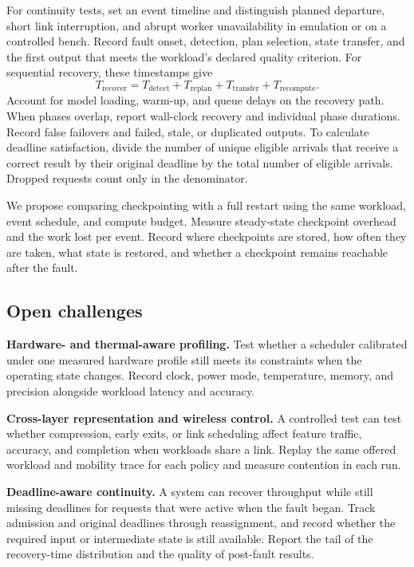 \documentclass[journal]{IEEEtran}
\begin{document}
For continuity tests, set an event timeline and distinguish planned departure, short link interruption, and abrupt worker unavailability in emulation or on a controlled bench. Record fault onset, detection, plan selection, state transfer, and the first output that meets the workload's declared quality criterion. For sequential recovery, these timestamps give
\begin{equation}\label{eq:recovery}
T_{\mathrm{recover}}=T_{\mathrm{detect}}+T_{\mathrm{replan}}
 +T_{\mathrm{transfer}}+T_{\mathrm{recompute}}.
\end{equation}
Account for model loading, warm-up, and queue delays on the recovery path. When phases overlap, report wall-clock recovery and individual phase durations. Record false failovers and failed, stale, or duplicated outputs. To calculate deadline satisfaction, divide the number of unique eligible arrivals that receive a correct result by their original deadline by the total number of eligible arrivals. Dropped requests count only in the denominator.

We propose comparing checkpointing with a full restart using the same workload, event schedule, and compute budget. Measure steady-state checkpoint overhead and the work lost per event. Record where checkpoints are stored, how often they are taken, what state is restored, and whether a checkpoint remains reachable after the fault.

\subsection{Open challenges}
\textbf{Hardware- and thermal-aware profiling.}
Test whether a scheduler calibrated under one measured hardware profile still meets its constraints when the operating state changes. Record clock, power mode, temperature, memory, and precision alongside workload latency and accuracy.

\textbf{Cross-layer representation and wireless control.}
A controlled test can test whether compression, early exits, or link scheduling affect feature traffic, accuracy, and completion when workloads share a link. Replay the same offered workload and mobility trace for each policy and measure contention in each run.

\textbf{Deadline-aware continuity.}
A system can recover throughput while still missing deadlines for requests that were active when the fault began. Track admission and original deadlines through reassignment, and record whether the required input or intermediate state is still available. Report the tail of the recovery-time distribution and the quality of post-fault results.
\end{document}
